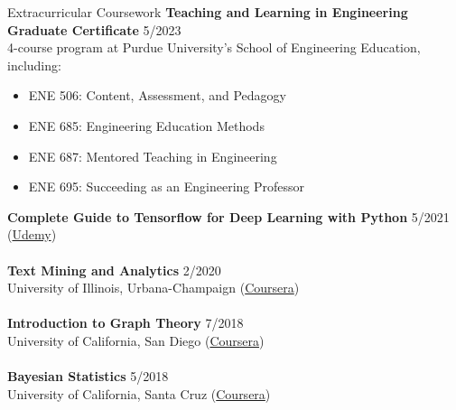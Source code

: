 \documentclass{CV} %
\begin{document}
\begin{rSection}{Extracurricular Coursework}
    \textbf{Teaching and Learning in Engineering Graduate Certificate} \hfill{5/2023}
    \\ 4-course program at Purdue University's School of Engineering Education, including:
    \begin{itemize}
        \item ENE 506: Content, Assessment, and Pedagogy
        \item ENE 685: Engineering Education Methods
        \item ENE 687: Mentored Teaching in Engineering
        \item ENE 695: Succeeding as an Engineering Professor
    \end{itemize}
    \textbf{Complete Guide to Tensorflow for Deep Learning with Python} \hfill 5/2021
    \\ (\href{https://www.udemy.com/certificate/UC-caa1f4ed-6be6-4b50-9bd1-1b57ab7c196a}{Udemy}) \\
    \\ \textbf{Text Mining and Analytics} \hfill 2/2020
    \\ University of Illinois, Urbana-Champaign (\href{https://coursera.org/share/7eac25e880771bf576b661324a4d79be}{Coursera}) \\
    \\ \textbf{Introduction to Graph Theory} \hfill 7/2018
    \\ University of California, San Diego (\href{https://coursera.org/share/97583460aa0510f570f971844f19d16b}{Coursera}) \\
    \\ \textbf{Bayesian Statistics} \hfill 5/2018
    \\ University of California, Santa Cruz (\href{https://coursera.org/share/8d0b0387400c53f13a7ce2b2b81153fc}{Coursera}) 
\end{rSection}
\end{document}
